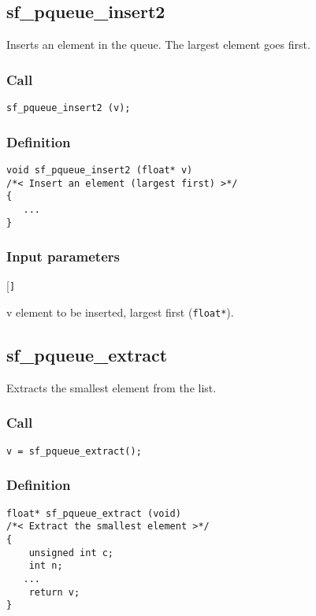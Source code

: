 \subsection{{sf\_pqueue\_insert2}}
Inserts an element in the queue. The largest element goes first.

\subsubsection*{Call}
\begin{verbatim}sf_pqueue_insert2 (v);\end{verbatim}

\subsubsection*{Definition}
\begin{verbatim}
void sf_pqueue_insert2 (float* v)
/*< Insert an element (largest first) >*/
{
   ...
}
\end{verbatim}

\subsubsection*{Input parameters}
\begin{desclist}{\tt }{\quad}[\tt ]
   \setlength\itemsep{0pt}
   \item[v] element to be inserted, largest first (\texttt{float*}).  
\end{desclist}




\subsection{{sf\_pqueue\_extract}}
Extracts the smallest element from the list.

\subsubsection*{Call}
\begin{verbatim}v = sf_pqueue_extract();\end{verbatim}

\subsubsection*{Definition}
\begin{verbatim}
float* sf_pqueue_extract (void)
/*< Extract the smallest element >*/
{
    unsigned int c;
    int n;
   ...
    return v;
}
\end{verbatim}

